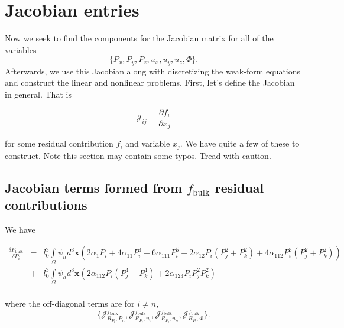 \documentclass[16pt]{article} %
\begin{document}
\section{Jacobian entries}
%
Now we seek to find the components for the Jacobian matrix for all of the variables 
%
\Large
$$\{P_x, P_y, P_z, u_x, u_y, u_z, \Phi \}.$$
\normalsize
%
 Afterwards, we use this Jacobian along with discretizing the weak-form equations and construct the linear and nonlinear problems. First, let's define the Jacobian in general. That is

$$\mathscr{J}_{ij} = \frac{\partial f_i}{\partial x_j}$$

for some residual contribution $f_i$ and variable $x_j$.  We have quite a few of these to construct. Note this section may contain some typos. Tread with caution. 

\newpage

\subsection{Jacobian terms formed from $f_\mathrm{bulk}$ residual contributions}

We have 

\begin{eqnarray}
\frac{\delta F_\mathrm{bulk}}{\delta P_i} &=& l_0^3\int\limits_\Omega \psi_h d^3 {\boldsymbol x} \left(2 \alpha_1 P_i + 4 \alpha_{11} P_i^3 + 6 \alpha_{111} P_i^5 + 2 \alpha_{12} P_i \left(P_j^2 + P_k^2 \right) + 4 \alpha_{112} P_i^3 \left(P_j^2 + P_k^2 \right)  \right)\\ \nonumber
&+& l_0^3 \int\limits_\Omega \psi_h d^3 {\boldsymbol x} \left(2 \alpha_{112} P_i \left(P_j^4 + P_k^4 \right) + 2 \alpha_{123} P_i P_j^2 P_k^2  \right) \\ \nonumber
\end{eqnarray}

where the off-diagonal terms are for $i \neq n$,
\Large
$$\{ \mathscr{J}_{R_{P_i}, P_n}^{f_\mathrm{bulk}}, \mathscr{J}_{R_{P_i}, u_i}^{f_\mathrm{bulk}}, \mathscr{J}_{R_{P_i}, u_n}^{f_\mathrm{bulk}}, \mathscr{J}_{R_{P_i}, \Phi}^{f_\mathrm{bulk}} \}.$$
\normalsize
\end{document}
